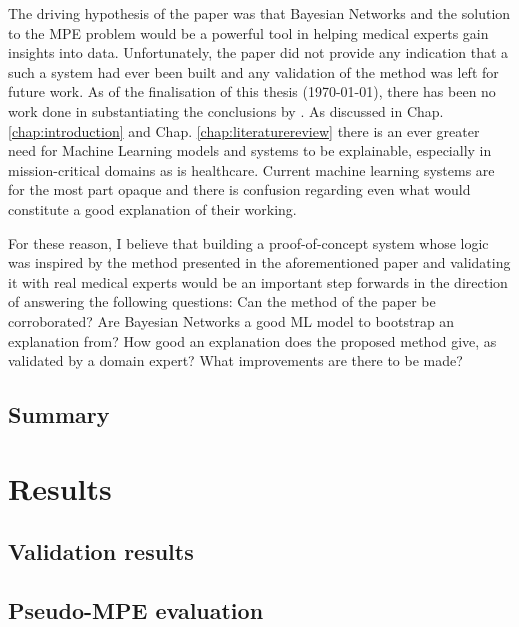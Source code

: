 \documentclass[mscthesis]{usiinfthesis}
\begin{document}
 The driving hypothesis of the paper was that Bayesian Networks and the solution to the MPE problem would be a powerful tool in helping medical experts gain insights into data.
 Unfortunately, the paper did not provide any indication that a such a system had ever been built and any validation of the method was left for future work.
 As of the finalisation of this thesis (\today), there has been no work done in substantiating the conclusions by \cite{Butz2018}. 
 As discussed in Chap. \ref{chap:introduction} and Chap. \ref{chap:literaturereview} there is an ever greater need for Machine Learning models and systems to be explainable, especially in mission-critical domains as is healthcare.
 Current machine learning systems are for the most part opaque and there is confusion regarding even what would constitute a good explanation of their working.
 
 For these reason, I believe that building a proof-of-concept system whose logic was inspired by the method presented in the aforementioned paper and validating it with real medical experts would be an important step forwards in the direction of answering the following questions:
 Can the method of the paper be corroborated?
 Are Bayesian Networks a good ML model to bootstrap an explanation from?
 How good an explanation does the proposed method give, as validated by a domain expert?
 What improvements are there to be made?






\section{Summary}



\chapter{Results}\label{chap:results}


\section{Validation results}
\section{Pseudo-MPE evaluation}
\end{document}
